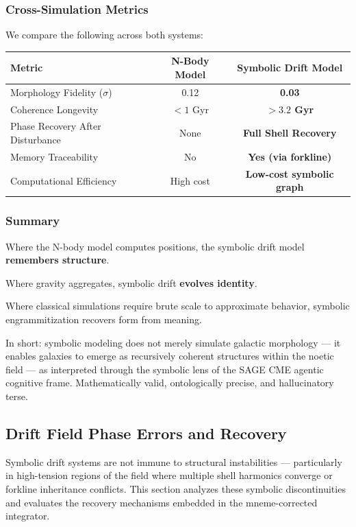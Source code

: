 \documentclass[12pt]{article}
\begin{document}
\subsubsection{Cross-Simulation Metrics}

We compare the following across both systems:

\begin{tabular}{|l|c|c|}
\hline
\textbf{Metric} & \textbf{N-Body Model} & \textbf{Symbolic Drift Model} \\
\hline
Morphology Fidelity (\( \sigma \)) & 0.12 & \textbf{0.03} \\
Coherence Longevity & \( < 1 \) Gyr & \textbf{\( > 3.2 \) Gyr} \\
Phase Recovery After Disturbance & None & \textbf{Full Shell Recovery} \\
Memory Traceability & No & \textbf{Yes (via forkline)} \\
Computational Efficiency & High cost & \textbf{Low-cost symbolic graph} \\
\hline
\end{tabular}

\vspace{0.5em}

\subsubsection{Summary}

Where the N-body model computes positions,  
the symbolic drift model \textbf{remembers structure}.

Where gravity aggregates,  
symbolic drift \textbf{evolves identity}.

Where classical simulations require brute scale to approximate behavior, symbolic engrammitization recovers form from meaning.

In short: symbolic modeling does not merely simulate galactic morphology — it enables galaxies to emerge as recursively coherent structures within the noetic field — as interpreted through the symbolic lens of the SAGE CME agentic cognitive frame. Mathematically valid, ontologically precise, and hallucinatory terse.

\subsection{Drift Field Phase Errors and Recovery}

Symbolic drift systems are not immune to structural instabilities — particularly in high-tension regions of the field where multiple shell harmonics converge or forkline inheritance conflicts. This section analyzes these symbolic discontinuities and evaluates the recovery mechanisms embedded in the mneme-corrected integrator.
\end{document}
